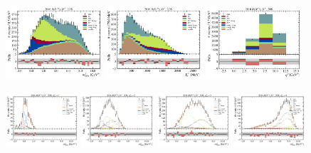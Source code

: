\begin{figure}[!htb]
    \centering
    \includegraphics[width=0.32\textwidth]{./figs-fit-fit-results/ctrl-fit/stacked/fit_result-stacked-Dst-2os-mmiss2.pdf}
    \includegraphics[width=0.32\textwidth]{./figs-fit-fit-results/ctrl-fit/stacked/fit_result-stacked-Dst-2os-el.pdf}
    \includegraphics[width=0.32\textwidth]{./figs-fit-fit-results/ctrl-fit/stacked/fit_result-stacked-Dst-2os-q2.pdf}

    \includegraphics[width=0.24\textwidth]{./figs-fit-fit-results/ctrl-fit/lines_q2_slices/fit_result-lines_q2_idx1-Dst-2os-mmiss2.pdf}
    \includegraphics[width=0.24\textwidth]{./figs-fit-fit-results/ctrl-fit/lines_q2_slices/fit_result-lines_q2_idx2-Dst-2os-mmiss2.pdf}
    \includegraphics[width=0.24\textwidth]{./figs-fit-fit-results/ctrl-fit/lines_q2_slices/fit_result-lines_q2_idx3-Dst-2os-mmiss2.pdf}
    \includegraphics[width=0.24\textwidth]{./figs-fit-fit-results/ctrl-fit/lines_q2_slices/fit_result-lines_q2_idx4-Dst-2os-mmiss2.pdf}


\end{figure}
